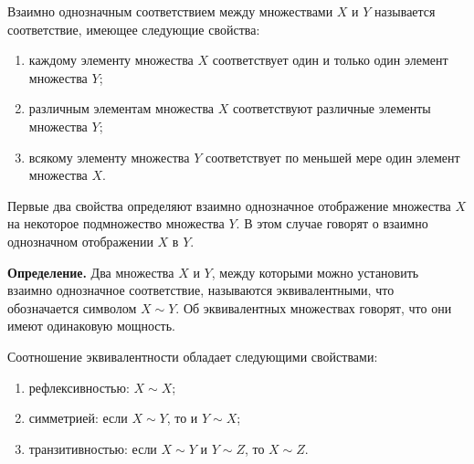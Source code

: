 \begin{rusblock}
Взаимно однозначным соответствием между множествами $X$ и $Y$ называется соответствие, имеющее следующие свойства:
\begin{enumerate}[leftmargin=2.2em]
\item каждому элементу множества $X$ соответствует один и только один элемент множества $Y$;
\item различным элементам множества $X$ соответствуют различные элементы множества $Y$;
\item всякому элементу множества $Y$ соответствует по меньшей мере один элемент множества $X$.
\end{enumerate}
Первые два свойства определяют взаимно однозначное отображение множества $X$ на некоторое подмножество множества $Y$. В этом случае говорят о взаимно однозначном отображении $X$ в $Y$.
\end{rusblock}

\begin{rusblock}
\textbf{Определение.} Два множества $X$ и $Y$, между которыми можно установить взаимно однозначное соответствие, называются эквивалентными, что обозначается символом $X\sim Y$. Об эквивалентных множествах говорят, что они имеют одинаковую мощность.

Соотношение эквивалентности обладает следующими свойствами:
\begin{enumerate}[leftmargin=2.2em]
\item рефлексивностью: $X\sim X$;
\item симметрией: если $X\sim Y$, то и $Y\sim X$;
\item транзитивностью: если $X\sim Y$ и $Y\sim Z$, то $X\sim Z$.
\end{enumerate}
\end{rusblock}

